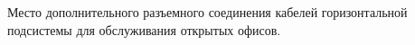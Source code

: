 Место дополнительного разъемного соединения кабелей
горизонтальной подсистемы для обслуживания открытых офисов.